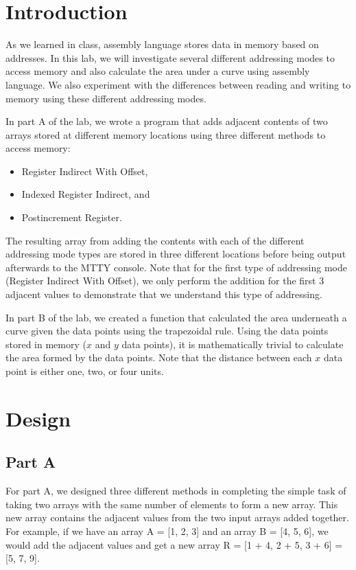 \documentclass[10pt, letterpaper, titlepage]{article} %
\title{\textbf{\Huge{
\begin{center}
Introduction to\\ Addressing Modes\\
\end{center}
}}}
\author{Benjamin Kong | 1573684\\Lora Ma ||||| 1570935\\ \\ECE 212 Lab Section H11}
\begin{document}
 
\maketitle 
\thispagestyle{empty}
\tableofcontents 
\newpage
{}

\begin{multicols*}{2}


\section{Introduction}
As we learned in class, assembly language stores data in memory based on addresses. 
In this lab, we will investigate several different addressing modes to access memory and also calculate the area under a curve using assembly language. 
We also experiment with the differences between reading and writing to memory using these different addressing modes.

In part A of the lab, we wrote a program that adds adjacent contents of two arrays stored at different memory locations using three different methods to access memory:
\begin{itemize}
	\item Register Indirect With Offset,
	\item Indexed Register Indirect, and
	\item Postincrement Register.
\end{itemize}
The resulting array from adding the contents with each of the different addressing mode types are stored in three different locations before being output afterwards to the MTTY console. 
Note that for the first type of addressing mode (Register Indirect With Offset), we only perform the addition for the first 3 adjacent values to demonstrate that we understand this type of addressing.

In part B of the lab, we created a function that calculated the area underneath a curve given the data points using the trapezoidal rule. 
Using the data points stored in memory ($x$ and $y$ data points), it is mathematically trivial to calculate the area formed by the data points. 
Note that the distance between each $x$ data point is either one, two, or four units. 

\section{Design}
\subsection{Part A}
For part A, we designed three different methods in completing the simple task of taking two arrays with the same number of elements to form a new array.
This new array contains the adjacent values from the two input arrays added together.
For example, if we have an array A = [1, 2, 3] and an array B = [4, 5, 6], we would add the adjacent values and get a new array R = [1 + 4, 2 + 5, 3 + 6] = [5, 7, 9].


\end{multicols*}
\end{document}
